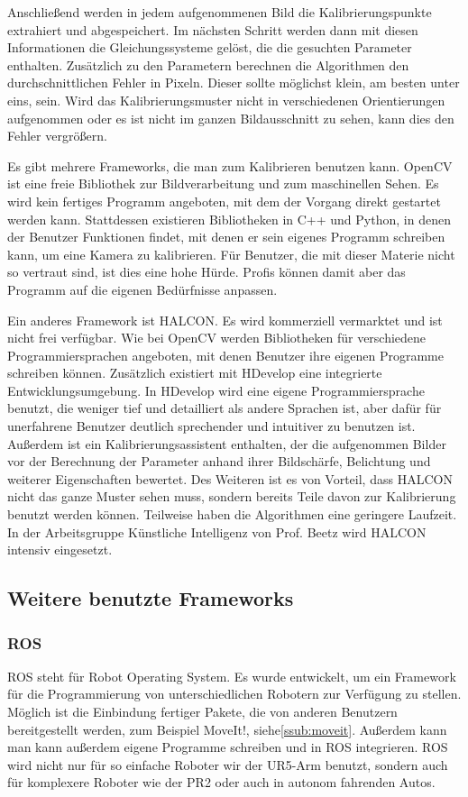 Anschließend werden in jedem aufgenommenen Bild die Kalibrierungspunkte extrahiert und abgespeichert. Im nächsten Schritt werden dann mit diesen Informationen die Gleichungssysteme gelöst, die die gesuchten Parameter enthalten. Zusätzlich zu den Parametern berechnen die Algorithmen den durchschnittlichen Fehler in Pixeln. Dieser sollte möglichst klein, am besten unter eins, sein. Wird das Kalibrierungsmuster nicht in verschiedenen Orientierungen aufgenommen oder es ist nicht im ganzen Bildausschnitt zu sehen, kann dies den Fehler vergrößern.

Es gibt mehrere Frameworks, die man zum Kalibrieren benutzen kann. OpenCV ist eine freie Bibliothek zur Bildverarbeitung und zum maschinellen Sehen. Es wird kein fertiges Programm angeboten, mit dem der Vorgang direkt gestartet werden kann. Stattdessen existieren Bibliotheken in C++ und Python, in denen der Benutzer Funktionen findet, mit denen er sein eigenes Programm schreiben kann, um eine Kamera zu kalibrieren. Für Benutzer, die mit dieser Materie nicht so vertraut sind, ist dies eine hohe Hürde. Profis können damit aber das Programm auf die eigenen Bedürfnisse anpassen.

Ein anderes Framework ist HALCON. Es wird kommerziell vermarktet und ist nicht frei verfügbar. Wie bei OpenCV werden Bibliotheken für verschiedene Programmiersprachen angeboten, mit denen Benutzer ihre eigenen Programme schreiben können. Zusätzlich existiert mit HDevelop eine integrierte Entwicklungsumgebung. In HDevelop wird eine eigene Programmiersprache benutzt, die weniger tief und detailliert als andere Sprachen ist, aber dafür für unerfahrene Benutzer deutlich sprechender und intuitiver zu benutzen ist. Außerdem ist ein Kalibrierungsassistent enthalten, der die aufgenommen Bilder vor der Berechnung der Parameter anhand ihrer Bildschärfe, Belichtung und weiterer Eigenschaften bewertet. Des Weiteren ist es von Vorteil, dass HALCON nicht das ganze Muster sehen muss, sondern bereits Teile davon zur Kalibrierung benutzt werden können. Teilweise haben die Algorithmen eine geringere Laufzeit. In der Arbeitsgruppe Künstliche Intelligenz von Prof. Beetz wird HALCON intensiv eingesetzt.

\subsection{Weitere benutzte Frameworks} %
\label{sub:weitere_benutzte_frameworks}
\subsubsection{ROS} %
\label{ssub:ros}
ROS \cite{ROS} steht für Robot Operating System. Es wurde entwickelt, um ein Framework für die Programmierung von unterschiedlichen Robotern zur Verfügung zu stellen. Möglich ist die Einbindung fertiger Pakete, die von anderen Benutzern bereitgestellt werden, zum Beispiel MoveIt!, siehe\autoref{ssub:moveit}. Außerdem kann man kann außerdem eigene Programme schreiben und in ROS integrieren. ROS wird nicht nur für so einfache Roboter wir der UR5-Arm benutzt, sondern auch für komplexere Roboter wie der PR2 oder auch in autonom fahrenden Autos.

